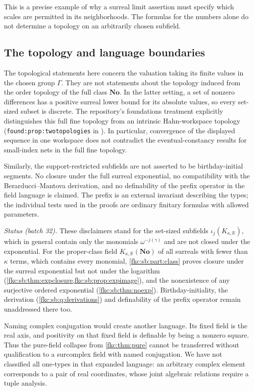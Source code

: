 \documentclass[11pt,letterpaper]{article}
\numberwithin{equation}{section}
\theoremstyle{definition}
\theoremstyle{remark}
\newcommand{\R}{\mathbb R}
\newcommand{\No}{\mathbf{No}}
\newcommand{\KN}[2]{K_{#1,#2}(\No)}%
\begin{document}
This is a precise example of why a surreal limit assertion must specify which scales are permitted in its neighborhoods. The formulas for the numbers alone do not determine a topology on an arbitrarily chosen subfield.

\subsection{The topology and language boundaries}
The topological statements here concern the valuation taking its finite values in the chosen group $\Gamma$. They are not statements about the topology induced from the order topology of the full class $\No$. In the latter setting, a set of nonzero differences has a positive surreal lower bound for its absolute values, so every set-sized subset is discrete. The repository's foundations treatment explicitly distinguishes this full fine topology from an intrinsic Hahn-workspace topology \cite{Repo} (\texttt{found:prop:twotopologies} in \cite{CollFound}). In particular, convergence of the displayed sequence in one workspace does not contradict the eventual-constancy results for small-index nets in the full fine topology.

Similarly, the support-restricted subfields are not asserted to be birthday-initial segments. No closure under the full surreal exponential, no compatibility with the Berarducci--Mantova derivation, and no definability of the prefix operator in the field language is claimed. The prefix is an external invariant describing the types; the individual tests used in the proofs are ordinary finitary formulas with allowed parameters.

\emph{Status (batch 32).} These disclaimers stand for the set-sized subfields $\iota_j(K_{\kappa,\R})$, which in general contain only the monomials $\omega^{-j(\gamma)}$ and are not closed under the exponential. For the proper-class field $\KN\kappa\R$ of all surreals with fewer than $\kappa$ terms, which contains every monomial, \cref{fkc:sb:part:class} proves closure under the surreal exponential but not under the logarithm (\cref{fkc:sb:thm:expclosure,fkc:sb:prop:expimage}), and the nonexistence of any surjective ordered exponential (\cref{fkc:sb:thm:noexp}). Birthday-initiality, the derivation (\cref{fkc:sb:q:derivations}) and definability of the prefix operator remain unaddressed there too.

Naming complex conjugation would create another language. Its fixed field is the real axis, and positivity on that fixed field is definable by being a nonzero square. Thus the pure-field collapse from \cref{fkc:thm:pure} cannot be transferred without qualification to a surcomplex field with named conjugation. We have not classified all one-types in that expanded language: an arbitrary complex element corresponds to a pair of real coordinates, whose joint algebraic relations require a tuple analysis.
\end{document}
